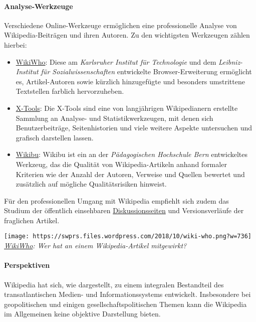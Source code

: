 \hypertarget{analyse-werkzeuge}{%
\paragraph{Analyse-Werkzeuge}\label{analyse-werkzeuge}}

Verschiedene Online-Werkzeuge ermöglichen eine professionelle Analyse
von Wikipedia-Beiträgen und ihren Autoren. Zu den wichtigsten Werkzeugen
zählen hierbei:

\begin{itemize}
\tightlist
\item
  \href{https://f-squared.org/whovisual/}{WikiWho}: Diese am
  \emph{Karlsruher Institut für Technologie} und dem
  \emph{Leibniz-Institut für Sozialwissenschaften} entwickelte
  Browser-Erweiterung ermöglicht es, Artikel-Autoren sowie kürzlich
  hinzugefügte und besonders umstrittene Textstellen farblich
  hervorzuheben.
\item
  \href{https://xtools.wmflabs.org/?uselang=de}{X-Tools}: Die X-Tools
  sind eine von langjährigen Wikipedianern erstellte Sammlung an
  Analyse- und Statistikwerkzeugen, mit denen sich Benutzerbeiträge,
  Seitenhistorien und viele weitere Aspekte untersuchen und grafisch
  darstellen lassen.
\item
  \href{http://wikibu.ch/}{Wikibu}: Wikibu ist ein an der
  \emph{Pädagogischen Hochschule Bern} entwickeltes Werkzeug, das die
  Qualität von Wikipedia-Artikeln anhand formaler Kriterien wie der
  Anzahl der Autoren, Verweise und Quellen bewertet und zusätzlich auf
  mögliche Qualitätsrisiken hinweist.
\end{itemize}

Für den professionellen Umgang mit Wikipedia empfiehlt sich zudem das
Studium der öffentlich einsehbaren
\href{https://de.wikipedia.org/wiki/Wikipedia:Diskussionsseiten}{Diskussionsseiten}
und Versionsverläufe der fraglichen Artikel.

\texttt{[image: https://swprs.files.wordpress.com/2018/10/wiki-who.png?w=736]}\\
\emph{\href{https://f-squared.org/whovisual/}{WikiWho}: Wer hat an einem
Wikipedia-Artikel mitgewirkt?}

\hypertarget{perspektiven}{%
\paragraph{Perspektiven}\label{perspektiven}}

Wikipedia hat sich, wie dargestellt, zu einem integralen Bestandteil des
transatlantischen Medien- und Informationssystems entwickelt.
Insbesondere bei geopolitischen und einigen gesellschaftspolitischen
Themen kann die Wikipedia im Allgemeinen keine objektive Darstellung
bieten.

